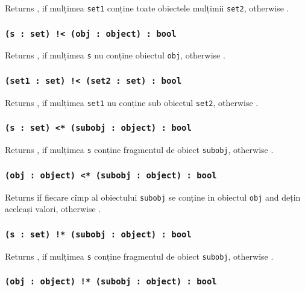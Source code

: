 Returns \true, if mulțimea \texttt{set1} conține toate obiectele mulțimii \texttt{set2}, otherwise \false.

\subsubsection{\texttt{(s : set) !< (obj : object) : bool}}

Returns \true{}, if mulțimea \texttt{s} nu conține obiectul \texttt{obj}, otherwise \false{}.

\subsubsection{\texttt{(set1 : set) !< (set2 : set) : bool}}

Returns \true, if mulțimea \texttt{set1} nu conține sub obiectul \texttt{set2}, otherwise \false.

\subsubsection{\texttt{(s : set) <* (subobj : object) : bool}}

Returns \true{}, if mulțimea \texttt{s} conține fragmentul de obiect \texttt{subobj}, otherwise \false{}.

\subsubsection{\texttt{(obj : object) <* (subobj : object) : bool}}

Returns \true{} if fiecare cîmp al obiectului \texttt{subobj} se conține in obiectul \texttt{obj} and dețin aceleași valori, otherwise \false{}.

\subsubsection{\texttt{(s : set) !* (subobj : object) : bool}}

Returns \false{}, if mulțimea \texttt{s} conține fragmentul de obiect \texttt{subobj}, otherwise \true{}.

\subsubsection{\texttt{(obj : object) !* (subobj : object) : bool}}

